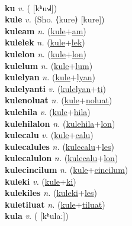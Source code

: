  \label{'kiplostecwon} \\
\textbf{ku} \textit{v.} ( [kʰu˧˩˧])
 \label{ku} \\
\textbf{kule} \textit{v.} (Sho. ⟨kure⟩ [kure])
 \label{kule} \\
\textbf{kuleam} \textit{n.} (\hyperref[kule]{kule}+\hyperref[am]{am})
 \label{kuleam} \\
\textbf{kulelek} \textit{n.} (\hyperref[kule]{kule}+\hyperref[lek]{lek})
 \label{kulelek} \\
\textbf{kulelon} \textit{n.} (\hyperref[kule]{kule}+\hyperref[lon]{lon})
 \label{kulelon} \\
\textbf{kulelum} \textit{n.} (\hyperref[kule]{kule}+\hyperref[lum]{lum})
 \label{kulelum} \\
\textbf{kulelyan} \textit{n.} (\hyperref[kule]{kule}+\hyperref[lyan]{lyan})
 \label{kulelyan} \\
\textbf{kulelyanti} \textit{v.} (\hyperref[kulelyan]{kulelyan}+\hyperref[ti]{ti})
 \label{kulelyanti} \\
\textbf{kulenoluat} \textit{n.} (\hyperref[kule]{kule}+\hyperref[noluat]{noluat})
 \label{kulenoluat} \\
\textbf{kulehila} \textit{v.} (\hyperref[kule]{kule}+\hyperref[hila]{hila})
 \label{kulehila} \\
\textbf{kulehilalon} \textit{n.} (\hyperref[kulehila]{kulehila}+\hyperref[lon]{lon})
 \label{kulehilalon} \\
\textbf{kulecalu} \textit{v.} (\hyperref[kule]{kule}+\hyperref[calu]{calu})
 \label{kulecalu} \\
\textbf{kulecalules} \textit{n.} (\hyperref[kulecalu]{kulecalu}+\hyperref[les]{les})
 \label{kulecalules} \\
\textbf{kulecalulon} \textit{n.} (\hyperref[kulecalu]{kulecalu}+\hyperref[lon]{lon})
 \label{kulecalulon} \\
\textbf{kulecincilum} \textit{n.} (\hyperref[kule]{kule}+\hyperref[cincilum]{cincilum})
 \label{kulecincilum} \\
\textbf{kuleki} \textit{v.} (\hyperref[kule]{kule}+\hyperref[ki]{ki})
 \label{kuleki} \\
\textbf{kulekiles} \textit{n.} (\hyperref[kuleki]{kuleki}+\hyperref[les]{les})
 \label{kulekiles} \\
\textbf{kuletiluat} \textit{n.} (\hyperref[kule]{kule}+\hyperref[tiluat]{tiluat})
 \label{kuletiluat} \\
\textbf{kula} \textit{v.} ( [kʰulaː])
 \label{kula} \\
